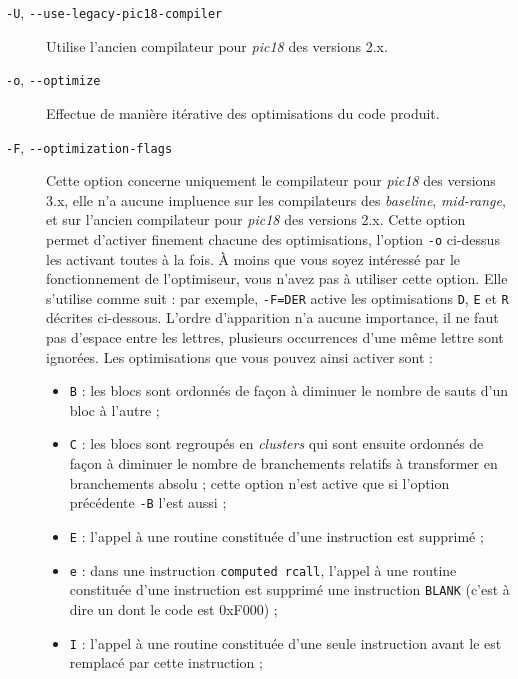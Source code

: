 

\begin{description}

  \item[\texttt{-U}, \texttt{-{-}use-legacy-pic18-compiler}] Utilise l'ancien compilateur pour \emph{pic18} des versions 2.x.



  \item[\texttt{-o}, \texttt{-{-}optimize}] Effectue de manière itérative des optimisations du code produit.


  \item[\texttt{-F}, \texttt{-{-}optimization-flags}] Cette option concerne uniquement le compilateur pour \emph{pic18} des versions 3.x, elle n'a aucune impluence sur les compilateurs des \emph{baseline}, \emph{mid-range}, et sur l'ancien compilateur pour \emph{pic18} des versions 2.x. Cette option permet d'activer finement chacune des optimisations, l'option \texttt{-o} ci-dessus les activant toutes à la fois. À moins que vous soyez intéressé par le fonctionnement de l'optimiseur, vous n'avez pas à utiliser cette option. Elle s'utilise comme suit : par exemple, \texttt{-F=DER} active les optimisations \texttt{D}, \texttt{E} et \texttt{R} décrites ci-dessous. L'ordre d'apparition n'a aucune importance, il ne faut pas d'espace entre les lettres, plusieurs occurrences d'une même lettre sont ignorées. Les optimisations que vous pouvez ainsi activer sont :
\begin{itemize}
  \item \texttt{B} : les blocs sont ordonnés de façon à diminuer le nombre de sauts d'un bloc à l'autre ;
  \item \texttt{C} : les blocs sont regroupés en \emph{clusters} qui sont ensuite ordonnés de façon à diminuer le nombre de branchements relatifs à transformer en branchements absolu ; cette option n'est active que si l'option précédente \texttt{-B} l'est aussi ;
  \item \texttt{E} : l'appel à une routine constituée d'une instruction  est supprimé ;
  \item \texttt{e} : dans une instruction \texttt{computed rcall}, l'appel à une routine constituée d'une instruction  est supprimé une instruction \texttt{BLANK} (c'est à dire un  dont le code est 0xF000) ;
  \item \texttt{I} : l'appel à une routine constituée d'une seule instruction avant le  est remplacé par cette instruction ;

\end{itemize}
\end{description}

